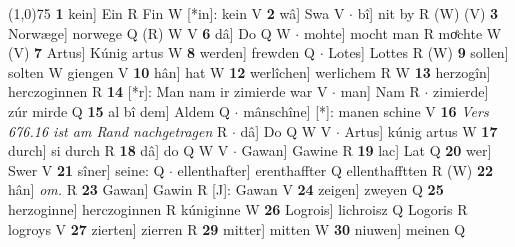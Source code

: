 \documentclass[8pt,a4paper,notitlepage]{article}
\begin{document}
\begin{table}[ht]
\begin{minipage}[t]{0.5\linewidth}
\line(1,0){75} \newline
\textbf{1} kein] Ein R Fin W [*in]: kein V \textbf{2} wâ] Swa V  $\cdot$ bî] nit by R (W) (V) \textbf{3} Norwæge] norwege Q (R) W V \textbf{6} dâ] Do Q W  $\cdot$ mohte] mocht man R moͤchte W (V) \textbf{7} Artus] Kúnig artus W \textbf{8} werden] frewden Q  $\cdot$ Lotes] Lottes R (W) \textbf{9} sollen] solten W giengen V \textbf{10} hân] hat W \textbf{12} werlîchen] werlichem R W \textbf{13} herzogîn] herczoginnen R \textbf{14} [*r]: Man nam ir zimierde war V  $\cdot$ man] Nam R  $\cdot$ zimierde] zúr mirde Q \textbf{15} al bî dem] Aldem Q  $\cdot$ mânschîne] [*]: manen schine V \textbf{16} \textit{Vers 676.16 ist am Rand nachgetragen} R   $\cdot$ dâ] Do Q W V  $\cdot$ Artus] kúnig artus W \textbf{17} durch] si durch R \textbf{18} dâ] do Q W V  $\cdot$ Gawan] Gawine R \textbf{19} lac] Lat Q \textbf{20} wer] Swer V \textbf{21} sîner] seine: Q  $\cdot$ ellenthafter] erenthaffter Q ellenthafftten R (W) \textbf{22} hân] \textit{om.} R \textbf{23} Gawan] Gawin R [J]: Gawan V \textbf{24} zeigen] zweyen Q \textbf{25} herzoginne] herczoginnen R kúniginne W \textbf{26} Logrois] lichroisz Q Logoris R logroys V \textbf{27} zierten] zierren R \textbf{29} mitter] mitten W \textbf{30} niuwen] meinen Q \newline
\end{minipage}
\end{table}
\end{document}

